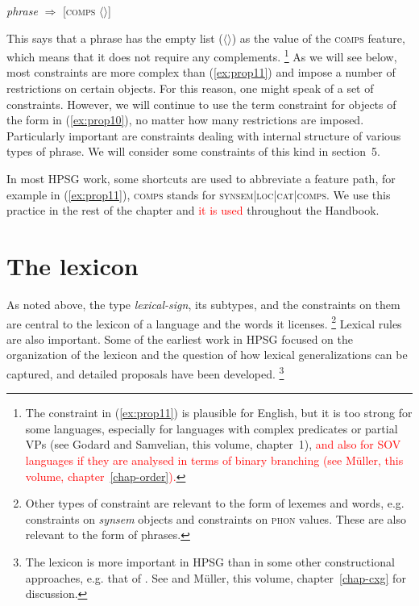 \documentclass[output=paper
	        ,collection
	        ,collectionchapter
 	        ,biblatex
                ,babelshorthands
                ,newtxmath
                ,draftmode
                ,colorlinks, citecolor=brown
]{langscibook}
\begin{document}
\ea\label{ex:prop11}
\emph{phrase} $\Rightarrow$ [\textsc{comps} $\langle \rangle$]
\z

This says that a phrase has the empty list ($\langle \rangle$) as the value of the \textsc{comps} feature, which means that it does not require any complements.%
%
\footnote{The constraint in (\ref{ex:prop11}) is plausible for English, but it is too strong for some languages, especially for languages with complex predicates or partial VPs (see Godard and Samvelian, this volume, chapter~1), \textcolor{red}{and also for SOV languages if they are analysed in terms of binary branching (see Müller, this volume, chapter~\ref{chap-order}).}}
%
As we will see below, most constraints are more complex than (\ref{ex:prop11}) and impose a number of restrictions on certain objects. For this reason, one might speak of a set of constraints. However, we will continue to use the term constraint for objects of the form in (\ref{ex:prop10}), no matter how many restrictions are imposed. Particularly important are constraints dealing with internal structure of various types of phrase. We will consider some constraints of this kind in section~5.

In most HPSG work, some shortcuts are used to abbreviate a feature path, for example in (\ref{ex:prop11}), \textsc{comps} stands for \textsc{synsem|loc|cat|comps}. We use this practice in the rest of the chapter and \textcolor{red}{it is used} throughout the Handbook.


\section{The lexicon}

As noted above, the type \emph{lexical-sign}, its subtypes, and the constraints on them are central to the lexicon of a language and the words it licenses.%
%
\footnote{Other types of constraint are relevant to the form of lexemes and words, e.g. constraints on \emph{synsem} objects and constraints on \textsc{phon} values. These are also relevant to the form of phrases.}
%
Lexical rules are also important. Some of the earliest work in HPSG focused on the organization of the lexicon and the question of how lexical generalizations can be captured, and detailed proposals have been developed.%
%
\footnote{The lexicon is more important in HPSG than in some other constructional approaches, e.g. that of \citet{Goldberg95a,Goldberg2006a}. See \citet{MWArgSt} and Müller, this volume, chapter~\ref{chap-cxg} for discussion.}
%
\end{document}
